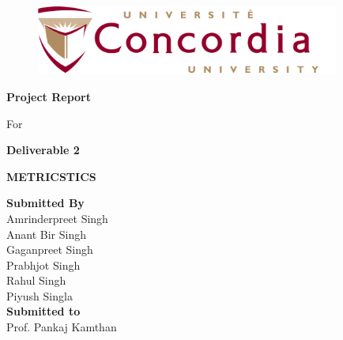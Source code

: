 \documentclass[runningheads]{llncs}
\begin{document}
\begin{titlepage}

\begin{center}
\vspace*{-1.2in}
\begin{figure}[htb]
\begin{center}
\includegraphics[width=10cm]{Concordia_logo.png}
\end{center}
\end{figure}
\begin{Large}
\vspace*{0.3in}
\textbf{Project Report} \\
\end{Large}
\vspace*{0.1in}
\begin{Large}
For\\
\end{Large}
\vspace*{0.1in}

\begin{Large}
\textbf{Deliverable 2} \\
\end{Large}
\vspace*{0.1in}

\begin{Large}
\textbf{METRICSTICS} \\
\end{Large}
\vspace*{0.3in}

\begin{large}
\textbf{Submitted By} \\
\vspace*{0.1in}
Amrinderpreet Singh\\
Anant Bir Singh\\
Gaganpreet Singh\\
Prabhjot Singh\\
Rahul Singh\\
Piyush Singla\\
\vspace*{0.2in}
\textbf{Submitted to}\\
\vspace*{0.1in}
Prof. Pankaj Kamthan\\
\vspace*{0.3in}


\end{large}
\end{center}
\end{titlepage}
\end{document}
